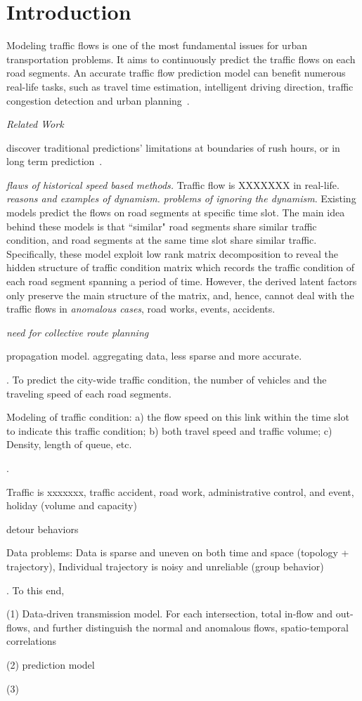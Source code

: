 \section{Introduction}
\label{sec-intro}

Modeling traffic flows is one of the most fundamental issues for urban transportation problems. It aims to continuously predict the traffic flows on each road segments. An accurate traffic flow prediction model can benefit numerous real-life tasks, such as travel time estimation, intelligent driving direction, traffic congestion detection and urban planning~\cite{Zheng2014TIST}.

{\em Related Work}
\bi
\item discover traditional predictions' limitations at boundaries of rush hours, or in long term prediction~\cite{TS2012ICDM}.
\ei



{\em flaws of historical speed based methods.} Traffic flow is XXXXXXX in real-life. {\em reasons and examples of dynamism.} {\em problems of ignoring the dynamism}.
%
Existing models predict the flows on road segments at specific time slot. The main idea behind these models is that ``similar" road segments share similar traffic condition, and road segments at the same time slot share similar traffic. Specifically, these model exploit low rank matrix decomposition to reveal the hidden structure of traffic condition matrix which records the traffic condition of each road segment spanning a period of time. However, the derived latent factors only preserve the main structure of the matrix, and, hence, cannot deal with the traffic flows in {\em anomalous cases}, \eg road works, events, accidents.

{\em need for collective route planning}

propagation model. aggregating data, less sparse and more accurate.

. To predict the city-wide traffic condition, \ie the number of vehicles and the traveling speed of each road segments.

Modeling of traffic condition:
a)	the flow speed on this link within the time slot to indicate this traffic condition;
b)	both travel speed and traffic volume;
c)	Density, length of queue, etc.

.
\bi
\item Traffic is xxxxxxx, \eg traffic accident, road work, administrative control, and event, holiday (volume and capacity)
\item detour behaviors
\item Data problems: Data is sparse and uneven on both time and space (topology + trajectory), Individual trajectory is noisy and unreliable (group behavior)
\ei

. To this end,

\ni (1) Data-driven transmission model. For each intersection, total in-flow and out-flows, and further distinguish the normal and anomalous flows, spatio-temporal correlations

\ni (2) prediction model

\ni (3)

